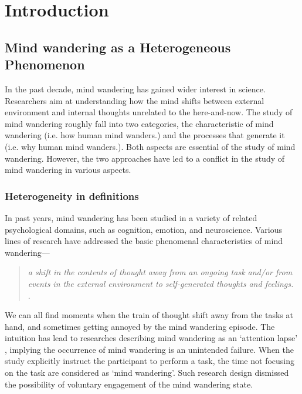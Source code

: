 \chapter{Introduction}
\label{ch:intro}

\newpage

\section{Mind wandering as a Heterogeneous Phenomenon}
In the past decade, mind wandering has gained wider interest in science. Researchers aim at understanding how the mind shifts between external environment and internal thoughts unrelated to the here-and-now. The study of mind wandering roughly fall into two categories, the characteristic of mind wandering (i.e. how human mind wanders.) and the processes that generate it (i.e. why human mind wanders.). Both aspects are essential of the study of mind wandering. However, the two approaches have led to a conflict in the study of mind wandering in various aspects. 

\subsection{Heterogeneity in definitions}
In past years, mind wandering has been studied in a variety of related psychological domains, such as cognition, emotion, and neuroscience. Various lines of research have addressed the basic phenomenal characteristics of mind wandering---
\begin{quote}
    \textit{a shift in the contents of thought away from an ongoing task and/or from events in the external environment to self-generated thoughts and feelings.}\\    
    \cite{SmallwoodSchooler2006,SmallwoodSchooler2015}.
\end{quote}
We can all find moments when the train of thought shift away from the tasks at hand, and sometimes getting annoyed by the mind wandering episode. The intuition has lead to researches describing mind wandering as an `attention lapse' \cite{McVayJOEP2009, McVay2012}, implying the occurrence of mind wandering is an unintended failure. When the study explicitly instruct the participant to perform a task, the time not focusing on the task are considered as `mind wandering'. Such research design dismissed the possibility of voluntary engagement of the mind wandering state. 

